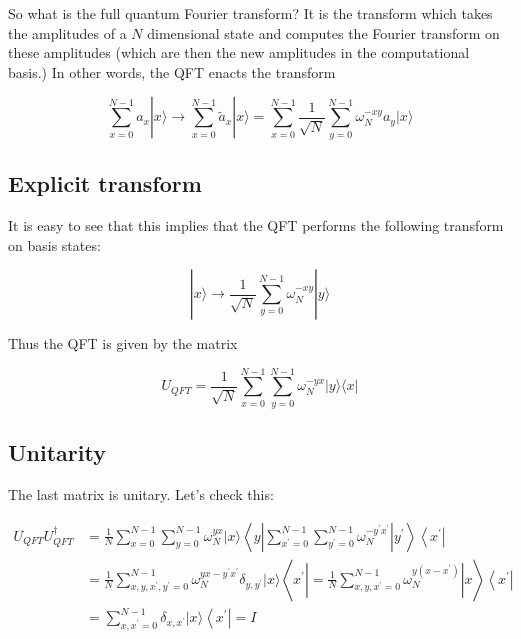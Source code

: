 \documentclass[%
oneside,                 %
final,                   %
10pt]{article}
\begin{document}
So what is the full quantum Fourier transform? It is the transform
which takes the amplitudes of a $N$ dimensional state and computes the
Fourier transform on these amplitudes (which are then the new
amplitudes in the computational basis.) In other words, the QFT enacts
the transform

\begin{equation*}
\sum_{x=0}^{N-1} a_{x}|x\rangle \rightarrow \sum_{x=0}^{N-1} \tilde{a}_{x}|x\rangle=\sum_{x=0}^{N-1} \frac{1}{\sqrt{N}} \sum_{y=0}^{N-1} \omega_{N}^{-x y} a_{y}|x\rangle 
\end{equation*}

\subsection{Explicit transform}
It is easy to see that this implies that the QFT performs the following transform on basis states:

\begin{equation*}
|x\rangle \rightarrow \frac{1}{\sqrt{N}} \sum_{y=0}^{N-1} \omega_{N}^{-x y}|y\rangle
\end{equation*}

Thus the QFT is given by the matrix

\begin{equation*}
U_{Q F T}=\frac{1}{\sqrt{N}} \sum_{x=0}^{N-1} \sum_{y=0}^{N-1} \omega_{N}^{-y x}|y\rangle\langle x| 
\end{equation*}

\subsection{Unitarity}
The last  matrix is unitary. Let's check this:

\begin{align*}
U_{Q F T} U_{Q F T}^{\dagger} & =\frac{1}{N} \sum_{x=0}^{N-1} \sum_{y=0}^{N-1} \omega_{N}^{y x}|x\rangle\left\langle y\left|\sum_{x^{\prime}=0}^{N-1} \sum_{y^{\prime}=0}^{N-1} \omega_{N}^{-y^{\prime} x^{\prime}}\right| y^{\prime}\right\rangle\left\langle x^{\prime}\right| \\
& =\frac{1}{N} \sum_{x, y, x^{\prime}, y^{\prime}=0}^{N-1} \omega_{N}^{y x-y^{\prime} x^{\prime}} \delta_{y, y^{\prime}}|x\rangle\left\langle x^{\prime}\left|=\frac{1}{N} \sum_{x, y, x^{\prime}=0}^{N-1} \omega_{N}^{y\left(x-x^{\prime}\right)}\right| x\right\rangle\left\langle x^{\prime}\right| \\
& =\sum_{x, x^{\prime}=0}^{N-1} \delta_{x, x^{\prime}}|x\rangle\left\langle x^{\prime}\right|=I 
\end{align*}
\end{document}
